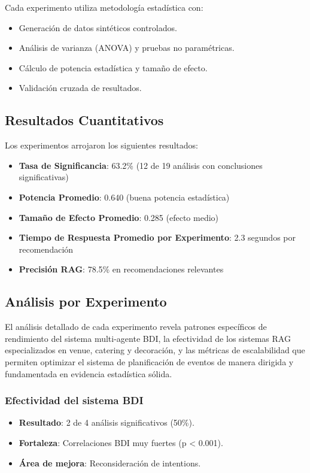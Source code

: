 \documentclass[runningheads,a4paper]{llncs}
\begin{document}
Cada experimento utiliza metodología estadística con:
\begin{itemize}
    \item Generación de datos sintéticos controlados.
    \item Análisis de varianza (ANOVA) y pruebas no paramétricas.
    \item Cálculo de potencia estadística y tamaño de efecto.
    \item Validación cruzada de resultados.
\end{itemize}

\subsection{Resultados Cuantitativos}

Los experimentos arrojaron los siguientes resultados:

\begin{itemize}
    \item \textbf{Tasa de Significancia}: 63.2\% (12 de 19 análisis con conclusiones significativas)
    \item \textbf{Potencia Promedio}: 0.640 (buena potencia estadística)
    \item \textbf{Tamaño de Efecto Promedio}: 0.285 (efecto medio)
    \item \textbf{Tiempo de Respuesta Promedio por Experimento}: 2.3 segundos por recomendación
    \item \textbf{Precisión RAG}: 78.5\% en recomendaciones relevantes
\end{itemize}

\subsection{Análisis por Experimento}

El análisis detallado de cada experimento revela patrones específicos de rendimiento del sistema multi-agente BDI, la efectividad 
de los sistemas RAG especializados en venue, catering y decoración, y las métricas de escalabilidad que permiten optimizar el 
sistema de planificación de eventos de manera dirigida y fundamentada en evidencia estadística sólida.

\subsubsection{Efectividad del sistema BDI}
\begin{itemize}
    \item \textbf{Resultado}: 2 de 4 análisis significativos (50\%).
    \item \textbf{Fortaleza}: Correlaciones BDI muy fuertes (p < 0.001).
    \item \textbf{Área de mejora}: Reconsideración de intentions.
\end{itemize}
\end{document}
